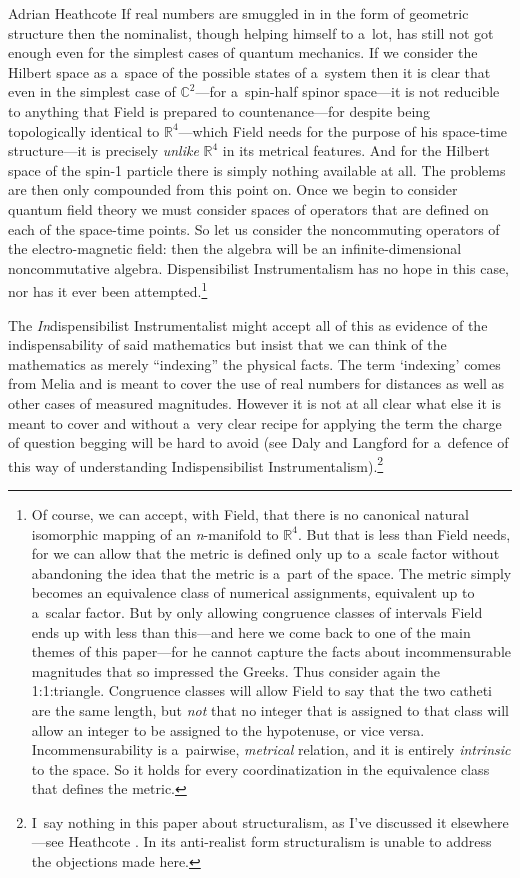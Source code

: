 \begin{artengenv}{Adrian Heathcote}
If real numbers are smuggled in in the form of geometric structure then the nominalist, though helping himself to a~lot, has still not got enough even for the simplest cases of quantum mechanics. If we consider the Hilbert space as a~space of the possible states of a~system then it is clear that even in the simplest case of $\mathbb{C}^{2}$---for a~spin-half spinor space---it is not reducible to anything that Field is prepared to countenance---for despite being topologically identical to $\mathbb{R}^{4}$---which Field needs for the purpose of his space-time structure---it is precisely \textit{unlike} $\mathbb{R}^{4}$ in its metrical features. And for the Hilbert space of the spin-1 particle there is simply nothing available at all. The problems are then only compounded from this point on. Once we begin to consider quantum field theory we must consider spaces of operators that are defined on each of the space-time points. So let us consider the noncommuting operators of the electro-magnetic field: then the algebra will be an infinite-dimensional noncommutative algebra. Dispensibilist Instrumentalism has no hope in this case, nor has it ever been attempted.\footnote{Of course, we can accept, with Field, that there is no canonical natural isomorphic mapping of an \textit{n}-manifold to $\mathbb{R}^{4}$. But that is less than Field needs, for we can allow that the metric is defined only up to a~scale factor without abandoning the idea that the metric is a~part of the space. The metric simply becomes an equivalence class of numerical assignments, equivalent up to a~scalar factor. But by only allowing congruence classes of intervals Field ends up with less than this---and here we come back to one of the main themes of this paper---for he cannot capture the  facts about incommensurable magnitudes that so impressed the Greeks. Thus consider again the 1:1:\sqrtwo triangle. Congruence classes will allow Field to say that the two catheti are the same length, but \textit{not} that no integer that is assigned to that class will allow an integer to be assigned to the hypotenuse, or vice versa. Incommensurability is a~pairwise, \textit{metrical} relation, and it is entirely \textit{intrinsic} to the space. So it holds for every coordinatization in the equivalence class that defines the metric.}

The \textit{In}dispensibilist Instrumentalist might accept all of this as evidence of the indispensability of said mathematics but insist that we can think of the mathematics as merely ``indexing'' the physical facts. The term `indexing' comes from Melia \parencite*{melia_weaseling_2000} and is meant to cover the use of real numbers for distances as well as other cases of measured magnitudes. However it is not at all clear what else it is meant to cover and without a~very clear recipe for applying the term the charge of question begging will be hard to avoid (see Daly and Langford \parencite*{daly_mathematical_2009} for a~defence of this way of understanding Indispensibilist Instrumentalism).\footnote{I~say nothing in this paper about structuralism, as I've discussed it elsewhere---see Heathcote \parencite*{heathcote_exhaustion_2014}. In its anti-realist form structuralism is unable to address the objections made here.}


\end{artengenv}
